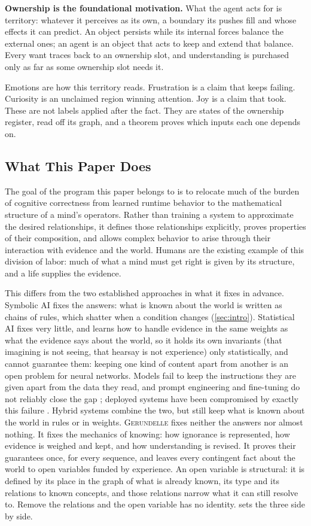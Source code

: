 \documentclass[11pt]{article}
\newcommand{\gerundelle}{\textsc{Gerundelle}}
\theoremstyle{remark}
\begin{document}
\textbf{Ownership is the foundational motivation.} What the agent acts for is territory:
whatever it perceives as its own, a boundary its pushes fill and whose effects it can
predict. An object persists while its internal forces balance the external ones; an agent
is an object that acts to keep and extend that balance. Every want traces back to an
ownership slot, and understanding is purchased only as far as some ownership slot needs it.

Emotions are how this territory reads. Frustration is a claim that keeps failing. Curiosity
is an unclaimed region winning attention. Joy is a claim that took. These are not labels
applied after the fact. They are states of the ownership register, read off its graph, and
a theorem proves which inputs each one depends on.

\subsection{What This Paper Does}

The goal of the program this paper belongs to is to relocate much of the burden of
cognitive correctness from learned runtime behavior to the mathematical structure of a
mind's operators. Rather than training a system to approximate the desired relationships,
it defines those relationships explicitly, proves properties of their composition, and
allows complex behavior to arise through their interaction with evidence and the world.
Humans are the existing example of this division of labor: much of what a mind must get
right is given by its structure, and a life supplies the evidence.

This differs from the two established approaches in what it fixes in advance. Symbolic AI
fixes the answers: what is known about the world is written as chains of rules, which
shatter when a condition changes (\cref{sec:intro}). Statistical AI fixes very little,
and learns how to handle evidence in the same weights as what the evidence says about the
world, so it holds its own invariants (that imagining is not seeing, that hearsay is not
experience) only statistically, and cannot guarantee them: keeping one kind of content
apart from another is an open problem for neural networks. Models fail to keep the
instructions they are given apart from the data they read, and prompt engineering and
fine-tuning do not reliably close the gap \citep{Zverev2025}; deployed systems have been
compromised by exactly this failure \citep{Greshake2023}. Hybrid systems combine the two,
but still keep what is known about the world in rules or in weights. \gerundelle{} fixes
neither the answers nor almost nothing. It fixes the mechanics of knowing: how ignorance is
represented, how evidence is weighed and kept, and how understanding is revised. It proves
their guarantees once, for every sequence, and leaves every contingent fact about the world
to open variables funded by experience. An open variable is structural: it is defined by
its place in the graph of what is already known, its type and its relations to known
concepts, and those relations narrow what it can still resolve to. Remove the relations and
the open variable has no identity.  sets the three side by side.
\end{document}
